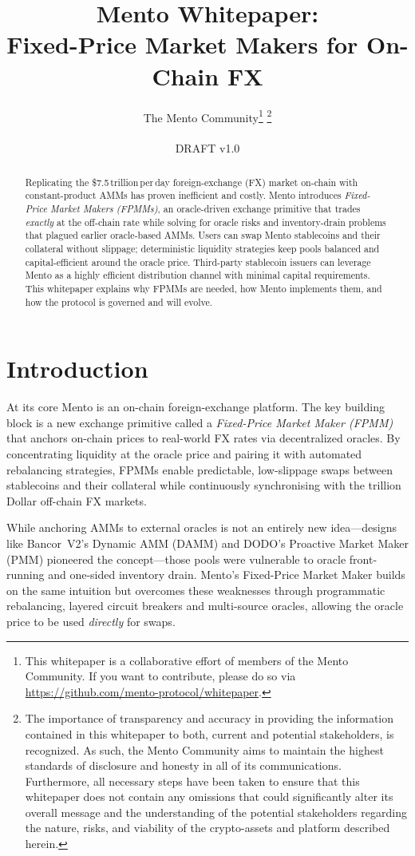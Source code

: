 \documentclass[a4paper]{article}
\title{Mento Whitepaper: \\ Fixed-Price Market Makers for On-Chain FX}
\date{The Mento Community\thanks{This whitepaper is a collaborative effort of members of the Mento Community. If you want to contribute, please do so via \url{https://github.com/mento-protocol/whitepaper}.} \thanks{The importance of transparency and accuracy in providing the information contained in this whitepaper to both, current and potential stakeholders, is recognized. As such, the Mento Community aims to maintain the highest standards of disclosure and honesty in all of its communications. Furthermore, all necessary steps have been taken to ensure that this whitepaper does not contain any omissions that could significantly alter its overall message and the understanding of the potential stakeholders regarding the nature, risks, and viability of the crypto-assets and platform described herein.} \\\quad\\ DRAFT  v1.0}
\providecommand{\hyp}{-}
\theoremstyle{definition}
\begin{document}
\maketitle

\begin{abstract}
Replicating the \$7.5\,trillion\,per\,day foreign\hyp exchange (FX) market\cite{bis_fx_survey_2022} on\hyp chain with constant\hyp product AMMs has proven inefficient and costly. Mento introduces \emph{Fixed\hyp Price Market Makers (FPMMs)}, an oracle\hyp driven exchange primitive that trades \emph{exactly} at the off\hyp chain rate while solving for oracle risks and inventory\hyp drain problems that plagued earlier oracle\hyp based AMMs. Users can swap Mento stablecoins and their collateral without slippage; deterministic liquidity strategies keep pools balanced and capital\hyp efficient around the oracle price. Third-party stablecoin issuers can leverage Mento as a highly efficient distribution channel with minimal capital requirements. This whitepaper explains why FPMMs are needed, how Mento implements them, and how the protocol is governed and will evolve.
\end{abstract}

\newpage
\tableofcontents

\newpage

\section{Introduction}
\label{sec:introduction}
At its core Mento is an on\hyp chain foreign\hyp exchange platform.  The key building block is a new exchange primitive called a \emph{Fixed\hyp Price Market Maker (FPMM)} that anchors on\hyp chain prices to real\hyp world FX rates via decentralized oracles.  By concentrating liquidity at the oracle price and pairing it with automated rebalancing strategies, FPMMs enable predictable, low\hyp slippage swaps between stablecoins and their collateral while continuously synchronising with the trillion Dollar off\hyp chain FX markets.

While anchoring AMMs to external oracles is not an entirely new idea—designs like Bancor~V2's Dynamic AMM (DAMM) and DODO's Proactive Market Maker (PMM) pioneered the concept—those pools were vulnerable to oracle front-running and one-sided inventory drain. Mento's Fixed-Price Market Maker builds on the same intuition but overcomes these weaknesses through programmatic rebalancing, layered circuit breakers and multi-source oracles, allowing the oracle price to be used \emph{directly} for swaps.
\end{document}
